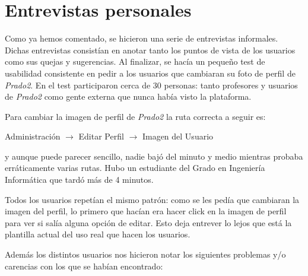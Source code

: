\section{Entrevistas personales}

Como ya hemos comentado, se hicieron una serie de entrevistas informales. Dichas entrevistas consistían en anotar tanto los puntos de vista de los usuarios como sus quejas y sugerencias. Al finalizar, se hacía un pequeño test de usabilidad consistente en pedir a los usuarios que cambiaran su foto de perfil de \textit{Prado2}. En el test participaron cerca de 30 personas: tanto profesores y usuarios de \textit{Prado2} como gente externa que nunca había visto la plataforma.

\bigskip
Para cambiar la imagen de perfil de \textit{Prado2} la ruta correcta a seguir es:

\begin{center}
Administración $\rightarrow$ Editar Perfil $\rightarrow$ Imagen del Usuario 
\end{center}

y aunque puede parecer sencillo, nadie bajó del minuto y medio mientras probaba erráticamente varias rutas. Hubo un estudiante del Grado en Ingeniería Informática que tardó más de 4 minutos.

\bigskip
Todos los usuarios repetían el mismo patrón: como se les pedía que cambiaran la imagen del perfil, lo primero que hacían era hacer click en la imagen de perfil para ver si salía alguna opción de editar. Esto deja entrever lo lejos que está la plantilla actual del uso real que hacen los usuarios. 

\bigskip
Además los distintos usuarios nos hicieron notar los siguientes problemas y/o carencias con los que se habían encontrado:

